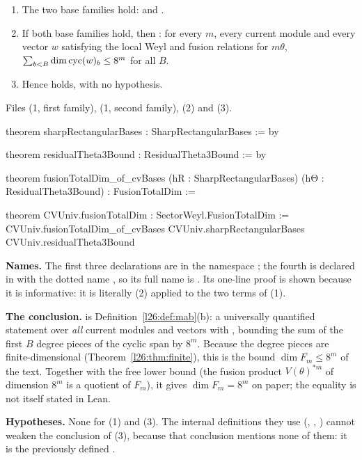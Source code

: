 \begin{theorem}\label{l26:thm:cvtotal}
\leavevmode
\begin{enumerate}
\item The two base families hold:  and .
\item If both base families hold, then : for every $m$, every current module and every vector $w$
  satisfying the local Weyl and fusion relations for $m\theta$, $\sum_{b<B}\dim\operatorname{cyc}(w)_b\le8^m$ for all $B$.
\item Hence  holds, with no hypothesis.
\end{enumerate}
\end{theorem}
\noindent Files  (1, first
family),  (1, second family),
 (2) and
 (3).
\begin{leancode}
theorem sharpRectangularBases : SharpRectangularBases := by

theorem residualTheta3Bound : ResidualTheta3Bound := by

theorem fusionTotalDim_of_cvBases (hR : SharpRectangularBases)
    (hΘ : ResidualTheta3Bound) : FusionTotalDim :=

theorem CVUniv.fusionTotalDim : SectorWeyl.FusionTotalDim :=
  CVUniv.fusionTotalDim_of_cvBases CVUniv.sharpRectangularBases CVUniv.residualTheta3Bound
\end{leancode}

\begin{dictionary}
\textbf{Names.} The first three declarations are in the namespace ; the fourth is declared in
 with the dotted name , so its full name is
. Its one-line proof is shown because it is informative: it is literally (2)
applied to the two terms of (1).

\textbf{The conclusion.}  is Definition~\ref{l26:def:mab}(b): a universally quantified
statement over \emph{all} current modules  and vectors  with , bounding the sum of the
first $B$ degree pieces of the cyclic span by $8^m$. Because the degree pieces are finite-dimensional
(Theorem~\ref{l26:thm:finite}), this is the bound $\dim F_m\le8^m$ of the text. Together with the free lower bound (the fusion
product $V(\theta)^{*m}$ of dimension $8^m$ is a quotient of $F_m$), it gives $\dim F_m=8^m$ on paper; the equality is not itself
stated in Lean.

\textbf{Hypotheses.} None for (1) and (3). The internal definitions they use (, ,
) cannot weaken the conclusion of (3), because that conclusion mentions none of them: it is the previously
defined .
\end{dictionary}

